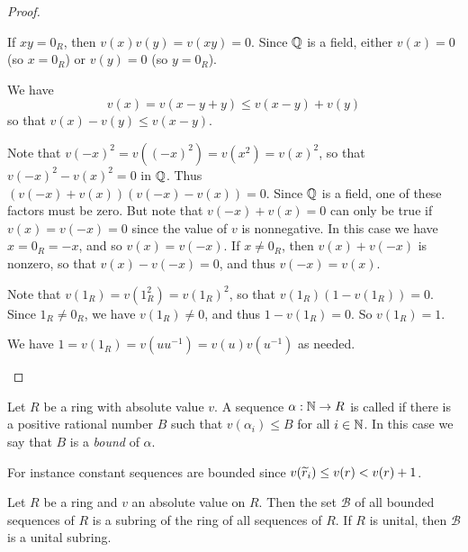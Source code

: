 \begin{proof}
\begin{inlineproplist}
\item If \(xy = 0_R\), then \(v(x)v(y) = v(xy) = 0\). Since \(\mathbb{Q}\) is a field, either \(v(x) = 0\) (so \(x = 0_R\)) or \(v(y) = 0\) (so \(y = 0_R\)).
\item We have \[ v(x) = v(x-y+y) \leq v(x-y) + v(y) \] so that \(v(x) - v(y) \leq v(x-y)\).
\item Note that \(v(-x)^2 = v((-x)^2) = v(x^2) = v(x)^2\), so that \(v(-x)^2 - v(x)^2 = 0\) in \(\mathbb{Q}\). Thus \((v(-x) + v(x))(v(-x) - v(x)) = 0\). Since \(\mathbb{Q}\) is a field, one of these factors must be zero. But note that \(v(-x) + v(x) = 0\) can only be true if \(v(x) = v(-x) = 0\) since the value of \(v\) is nonnegative. In this case we have \(x = 0_R = -x\), and so \(v(x) = v(-x)\). If \(x \neq 0_R\), then \(v(x) + v(-x)\) is nonzero, so that \(v(x) - v(-x) = 0\), and thus \(v(-x) = v(x)\).
\item Note that \(v(1_R) = v(1_R^2) = v(1_R)^2\), so that \(v(1_R)(1 - v(1_R)) = 0\). Since \(1_R \neq 0_R\), we have \(v(1_R) \neq 0\), and thus \(1 - v(1_R) = 0\). So \(v(1_R) = 1\).
\item We have \(1 = v(1_R) = v(uu^{-1}) = v(u)v(u^{-1})\) as needed.
\end{inlineproplist}
\end{proof}

\begin{dfn}
Let \(R\) be a ring with absolute value \(v\). A sequence \(\alpha : \mathbb{N} \rightarrow R\) is called  if there is a positive rational number \(B\) such that \(v(\alpha_i) \leq B\) for all \(i \in \mathbb{N}\). In this case we say that \(B\) is a \emph{bound} of \(\alpha\).
\end{dfn}

For instance constant sequences are bounded since \(v(\widetilde{r}_i) \leq v(r) < v(r) + 1\).

\begin{prop}
Let \(R\) be a ring and \(v\) an absolute value on \(R\). Then the set \(\mathcal{B}\) of all bounded sequences of \(R\) is a subring of the ring of all sequences of \(R\). If \(R\) is unital, then \(\mathcal{B}\) is a unital subring.
\end{prop}

